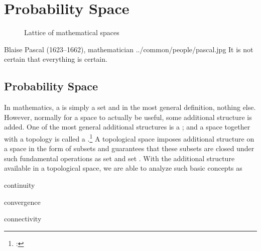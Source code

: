 \chapter{Probability Space}
\label{chp:prbspace}
\begin{figure}[th]
  \centering
  
  \caption{Lattice of mathematical spaces\label{fig:vector_spaces}}
\end{figure}%

\qboxnps
  {
    Blaise Pascal (1623--1662), mathematician
    \footnotemark
  }
  {../common/people/pascal.jpg}
  {It is not certain that everything is certain.}


\section{Probability Space}
In mathematics, a  is simply a set and in the most general definition,
nothing else.
However, normally for a space to actually be useful, some additional structure is added.
One of the most general additional structures is a ;
and a space together with a topology is called a
.\footnote{: }
A topological space imposes additional structure on a space  in the form of subsets
and guarantees that these subsets are closed under such fundamental operations as
set  and set .
With the additional structure available in a topological space, we are able to
analyze such basic concepts as
  \begin{liste}
    \item continuity
    \item convergence
    \item connectivity
  \end{liste}

